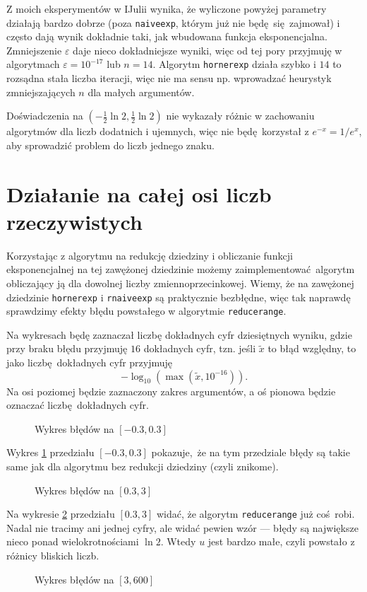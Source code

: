 \documentclass[a4paper, 12pt]{article}
\begin{document}
Z moich eksperymentów w IJulii wynika, że wyliczone powyżej parametry działają
bardzo dobrze (poza \texttt{naiveexp}, którym już nie będę się zajmował) i
często dają wynik dokładnie taki, jak wbudowana funkcja eksponencjalna.
Zmniejszenie $\varepsilon$ daje nieco dokładniejsze wyniki, więc od tej pory
przyjmuję w algorytmach $\varepsilon = 10^{-17}$ lub $n=14$.
Algorytm \texttt{hornerexp} działa szybko i $14$ to rozsądna stała liczba
iteracji, więc nie ma sensu np. wprowadzać heurystyk zmniejszających $n$ dla
małych argumentów.

Doświadczenia na $(-\frac{1}{2}\ln 2, \frac{1}{2} \ln 2)$ nie wykazały różnic
w zachowaniu algorytmów dla liczb dodatnich i ujemnych, więc nie będę korzystał
z $e^{-x} = 1/e^x$, aby sprowadzić problem do liczb jednego znaku.

\section{Działanie na całej osi liczb rzeczywistych}
Korzystając z algorytmu na redukcję dziedziny i obliczanie funkcji
eksponencjalnej na tej zawężonej dziedzinie możemy zaimplementować algorytm
obliczający ją dla dowolnej liczby zmiennoprzecinkowej.
Wiemy, że na zawężonej dziedzinie \texttt{hornerexp} i \texttt{rnaiveexp}
są praktycznie bezbłędne, więc tak naprawdę sprawdzimy efekty błędu
powstałego w algorytmie \texttt{reducerange}.

Na wykresach będę zaznaczał liczbę dokładnych cyfr dziesiętnych wyniku, gdzie
przy braku błędu przyjmuję $16$ dokładnych cyfr, tzn. jeśli $\tilde{x}$ to błąd
względny, to jako liczbę dokładnych cyfr przyjmuję
$$-\log_{10}(\max(\tilde{x}, 10^{-16})).$$
Na osi poziomej będzie zaznaczony zakres argumentów,
a oś pionowa będzie oznaczać liczbę dokładnych cyfr.

\begin{figure}
	\centering
	\resizebox{\linewidth}{!}{}
	\caption{Wykres błędów na $[-0.3, 0.3]$}
	\label{p1}
\end{figure}

Wykres \ref{p1} przedziału $[-0.3, 0.3]$ pokazuje, że na tym przedziale
błędy są takie same jak dla algorytmu bez redukcji dziedziny (czyli znikome).
\begin{figure}
	\centering
	\resizebox{\linewidth}{!}{}
	\caption{Wykres błędów na $[0.3, 3]$}
	\label{p2}
\end{figure}


Na wykresie \ref{p2} przedziału $[0.3, 3]$ widać,
że algorytm \texttt{reducerange} już coś robi.
Nadal nie tracimy ani jednej cyfry, ale widać pewien wzór --- błędy są
największe nieco ponad wielokrotnościami $\ln 2$.
Wtedy $u$ jest bardzo małe, czyli powstało z różnicy bliskich liczb.
\begin{figure}
	\centering
	\resizebox{\linewidth}{!}{}
	\caption{Wykres błędów na $[3, 600]$}
	\label{p3}
\end{figure}
\end{document}
